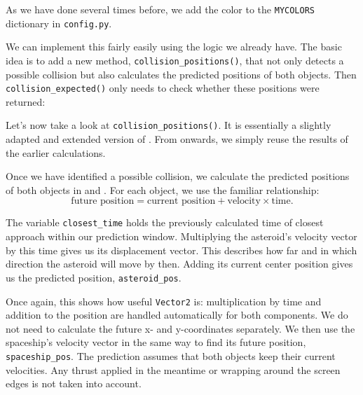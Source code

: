 As we have done several times before, we add the color to the \texttt{MYCOLORS} dictionary in \texttt{config.py}.


We can implement this fairly easily using the logic we already have. The basic idea is to add a new method, \texttt{collision\_positions()}, that not only detects a possible collision but also calculates the predicted positions of both objects. Then \texttt{collision\_expected()} only needs to check whether these positions were returned:


Let's now take a look at \texttt{collision\_positions()}. It is essentially a slightly adapted and extended version of . From  onwards, we simply reuse the results of the earlier calculations.

Once we have identified a possible collision, we calculate the predicted positions of both objects in  and . For each object, we use the familiar relationship:
\[
\text{future position}
=
\text{current position}
+
\text{velocity} \times \text{time}.
\]

The variable \texttt{closest\_time} holds the previously calculated time of closest approach within our prediction window. Multiplying the asteroid's velocity vector by this time gives us its displacement vector. This describes how far and in which direction the asteroid will move by then. Adding its current center position gives us the predicted position, \texttt{asteroid\_pos}.

Once again, this shows how useful \texttt{Vector2} is: multiplication by time and addition to the position are handled automatically for both components. We do not need to calculate the future x- and y-coordinates separately. We then use the spaceship's velocity vector in the same way to find its future position, \texttt{spaceship\_pos}. The prediction assumes that both objects keep their current velocities. Any thrust applied in the meantime or wrapping around the screen edges is not taken into account.

